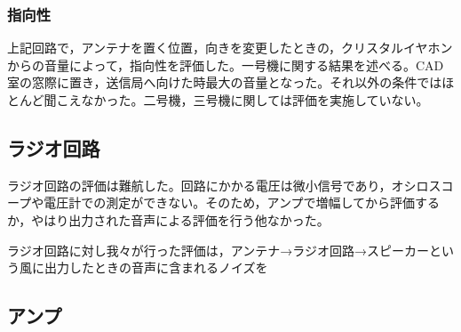 \documentclass[report.tex]{subfiles}
\begin{document}
\subsubsection{指向性}
上記回路で，アンテナを置く位置，向きを変更したときの，クリスタルイヤホンからの音量によって，指向性を評価した。一号機に関する結果を述べる。CAD室の窓際に置き，送信局へ向けた時最大の音量となった。それ以外の条件ではほとんど聞こえなかった。二号機，三号機に関しては評価を実施していない。

\subsection{ラジオ回路}
ラジオ回路の評価は難航した。回路にかかる電圧は微小信号であり，オシロスコープや電圧計での測定ができない。そのため，アンプで増幅してから評価するか，やはり出力された音声による評価を行う他なかった。

ラジオ回路に対し我々が行った評価は，アンテナ→ラジオ回路→スピーカーという風に出力したときの音声に含まれるノイズを

\subsection{アンプ}
\end{document}
